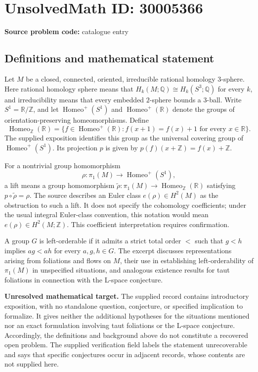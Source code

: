 \documentclass[11pt]{article}
\newcommand{\Z}{\mathbb{Z}}
\newcommand{\Q}{\mathbb{Q}}
\newcommand{\R}{\mathbb{R}}
\begin{document}
\section*{UnsolvedMath ID: 30005366}
\textbf{Source problem code:} catalogue entry
\subsection{Definitions and mathematical statement}
Let \(M\) be a closed, connected, oriented, irreducible rational homology \(3\)-sphere. Here rational homology sphere means that \(H_k(M;\Q)\cong H_k(S^3;\Q)\) for every \(k\), and irreducibility means that every embedded \(2\)-sphere bounds a \(3\)-ball. Write \(S^1=\R/\Z\), and let \(\operatorname{Homeo}^{+}(S^1)\) and \(\operatorname{Homeo}^{+}(\R)\) denote the groups of orientation-preserving homeomorphisms. Define
\[
\operatorname{Homeo}_{\Z}(\R)=\{f\in\operatorname{Homeo}^{+}(\R): f(x+1)=f(x)+1\text{ for every }x\in\R\}.
\]
The supplied exposition identifies this group as the universal covering group of \(\operatorname{Homeo}^{+}(S^1)\). Its projection \(p\) is given by \(p(f)(x+\Z)=f(x)+\Z\).

For a nontrivial group homomorphism
\[
\rho:\pi_1(M)\longrightarrow\operatorname{Homeo}^{+}(S^1),
\]
a lift means a group homomorphism \(\widetilde\rho:\pi_1(M)\to\operatorname{Homeo}_{\Z}(\R)\) satisfying \(p\circ\widetilde\rho=\rho\). The source describes an Euler class \(e(\rho)\in H^2(M)\) as the obstruction to such a lift. It does not specify the cohomology coefficients; under the usual integral Euler-class convention, this notation would mean \(e(\rho)\in H^2(M;\Z)\). This coefficient interpretation requires confirmation.

A group \(G\) is left-orderable if it admits a strict total order \(<\) such that \(g<h\) implies \(ag<ah\) for every \(a,g,h\in G\). The excerpt discusses representations arising from foliations and flows on \(M\), their use in establishing left-orderability of \(\pi_1(M)\) in unspecified situations, and analogous existence results for taut foliations in connection with the L-space conjecture.

\textbf{Unresolved mathematical target.} The supplied record contains introductory exposition, with no standalone question, conjecture, or specified implication to formalize. It gives neither the additional hypotheses for the situations mentioned nor an exact formulation involving taut foliations or the L-space conjecture. Accordingly, the definitions and background above do not constitute a recovered open problem. The supplied verification field labels the statement unrecoverable and says that specific conjectures occur in adjacent records, whose contents are not supplied here.
\end{document}
